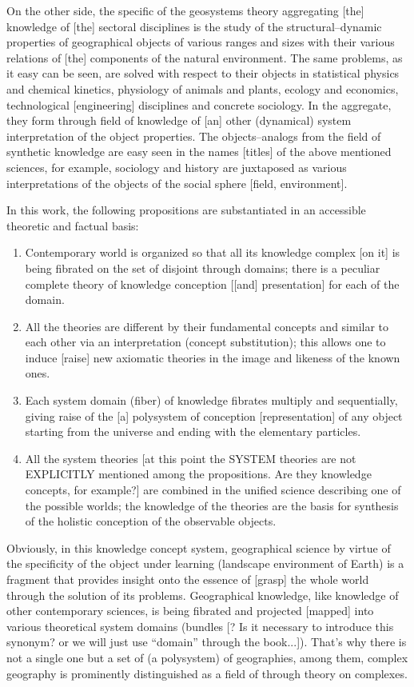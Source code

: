 \documentclass[12pt,leqno]{book}
\numberwithin{equation}{chapter}
\begin{document}
On the other side, the specific of the geosystems theory aggregating [the] knowledge of [the] sectoral disciplines is the study of the structural--dynamic properties of geographical objects of various ranges and sizes with their various relations of [the] components of the natural environment. The same problems, as it easy can be seen, are solved with respect to their objects in statistical physics and chemical kinetics, physiology of animals and plants, ecology and economics, technological [engineering] disciplines and concrete sociology. In the aggregate, they form through field of knowledge of [an] other (dynamical) system interpretation of the object properties. The objects--analogs from the field of synthetic knowledge are easy seen in the names [titles] of the above mentioned sciences, for example, sociology and history are juxtaposed as various interpretations of the objects of the social sphere [field, environment].

In this work, the following propositions are substantiated in an accessible theoretic and factual basis:
\begin{enumerate}\bf
\item{} Contemporary world is organized so that all its knowledge complex [on it] is being fibrated on the set of disjoint through domains; there is a peculiar complete theory of knowledge conception [[and] presentation] for each of the domain.
\item{} All the theories are different by their fundamental concepts and similar to each other via an interpretation (concept substitution); this allows one to induce [raise] new axiomatic theories in the image and likeness of the known ones.
\item{} Each system domain (fiber) of knowledge fibrates multiply and sequentially, giving raise of the [a] polysystem of conception [representation] of any object starting from the universe and ending with the elementary particles.
\item{} All the system theories [at this point the SYSTEM theories are not EXPLICITLY mentioned among the propositions. Are they knowledge concepts, for example?] are combined in the unified science describing one of the possible worlds; the knowledge of the theories are the basis for synthesis of the holistic conception of the observable objects.
\end{enumerate}

Obviously, in this knowledge concept system, geographical science by virtue of the specificity of the object under learning (landscape environment of Earth) is a fragment that provides insight onto the essence of [grasp] the whole world through the solution of its problems. Geographical knowledge, like knowledge of other contemporary sciences, is being fibrated and projected [mapped] into various theoretical system domains (bundles [? Is it necessary to introduce this synonym? or we will just use ``domain'' through the book...]). That's why there is not a single one but a set of (a polysystem) of geographies, among them, complex geography is prominently distinguished as a field of through theory on complexes.
\end{document}
